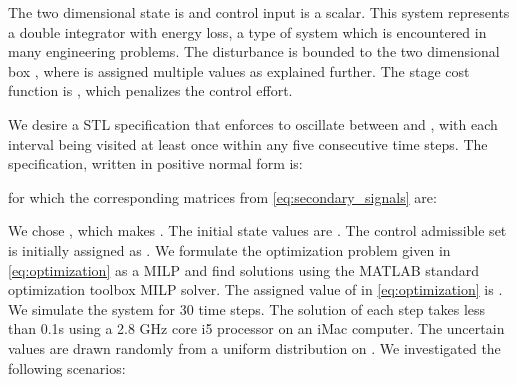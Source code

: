 \documentclass[letterpaper, 10 pt, conference]{ieeeconf}
\begin{document}
The two dimensional state is  and control input is a scalar. This system represents a double integrator with energy loss, a type of system which is encountered in many engineering problems.
The disturbance  is bounded to the two dimensional box , where  is assigned multiple values as explained further. The stage cost function is , which penalizes the control effort.

We desire a STL specification that enforces  to oscillate between  and , with each interval being visited at least once within any five consecutive time steps. The specification, written in positive normal form is:

for which the corresponding matrices from \eqref{eq:secondary_signals} are:

We chose , which makes . The initial state values are . The control admissible set is initially assigned as .  We formulate the optimization problem given in \eqref{eq:optimization} as a MILP and find solutions using the MATLAB standard optimization toolbox MILP solver. The assigned value of  in \eqref{eq:optimization} is . We simulate the system for 30 time steps. The solution of each step takes less than 0.1s using a 2.8 GHz core i5 processor on an iMac computer. The uncertain values  are drawn randomly from a uniform distribution on . We investigated the following scenarios:
\end{document}
